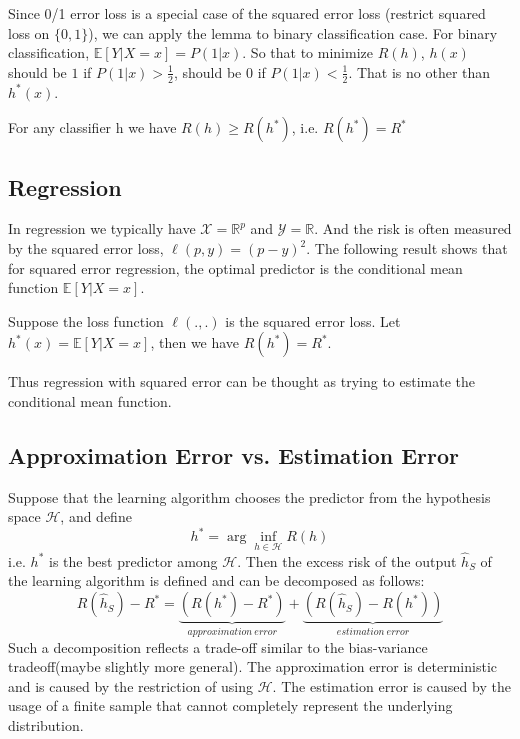 Since 0/1 error loss is a special case of the squared error loss (restrict squared loss on $\{0,1\}$), we can apply the lemma to binary classification case. For binary classification, $\mathbb{E}[Y|X=x]= P(1|x)$. So that to minimize $R(h)$, $h(x)$ should be $1$ if $P(1|x)>\frac{1}{2}$, should be $0$ if $P(1|x)<\frac{1}{2}$. That is no other than $h^*(x)$.
\begin{corollary}
	For any classifier h we have $R(h) \geq R(h^*)$, i.e. $R(h^*)=R^*$
\end{corollary}

\subsection{Regression}
In regression we typically have $\mathcal{X}=\mathbb{R}^p$ and $\mathcal{Y}=\mathbb{R}$. And the risk is often measured by the squared error loss, $\ell(p,y)=(p-y)^2$. The following result shows that for squared error regression, the optimal predictor is the conditional mean function $\mathbb{E}[Y|X=x]$.
\begin{corollary}
	Suppose the loss function $\ell(.,.)$ is the squared error loss. Let $h^*(x) = \mathbb{\mathbb{E}}[Y|X=x]$, then we have $R(h^*)=R^*$.
\end{corollary}

\noindent Thus regression with squared error can be thought as trying to estimate the conditional mean function.
\subsection{Approximation Error vs. Estimation Error}
Suppose that the learning algorithm chooses the predictor from the hypothesis space $\mathcal{H}$, and define
\begin{equation}
h^*=\arg\inf_{h \in \mathcal{H}} R(h)
\end{equation}
i.e. $h^*$ is the best predictor among $\mathcal{H}$. Then the excess risk of the output $\hat{h}_S$ of the learning algorithm is
defined and can be decomposed as follows:
\begin{equation}
R(\hat{h}_S)-R^* = \underbrace{\left( R(h^*)-R^* \right)}_{approximation\ error} + \underbrace{\left( R(\hat{h}_S)-R(h^*) \right)}_{estimation\ error}
\end{equation}
Such a decomposition reflects a trade-off similar to the bias-variance tradeoff(maybe slightly more general). The approximation error is deterministic and is caused by the restriction of using $\mathcal{H}$. The estimation error is caused by the usage of a finite sample that cannot completely represent the underlying distribution.\\

